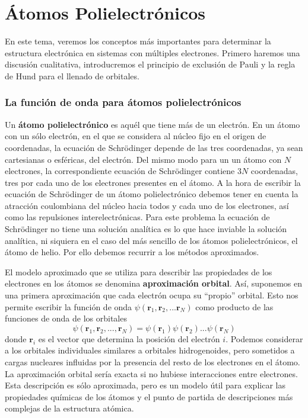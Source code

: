 \chapter{Átomos Polielectrónicos}
En este tema, veremos los conceptos más importantes para determinar 
la estructura electrónica en sistemas con múltiples electrones. Primero 
haremos una discusión cualitativa, introducremos el principio de 
exclusión de Pauli y la regla de Hund para el llenado de orbitales.

\subsection{La función de onda para átomos polielectrónicos}
Un \textbf{átomo polielectrónico} es aquél que tiene más de un electrón.
En un átomo con un sólo electrón, en el que se considera al núcleo
fijo en el origen de coordenadas, la ecuación de Schrödinger depende
de las tres coordenadas, ya sean cartesianas o esféricas, del electrón.
Del mismo modo para un un átomo con $N$ electrones, la correspondiente
ecuación de Schrödinger contiene $3N$ coordenadas, tres por cada uno 
de los electrones presentes en el átomo. A la hora de escribir la 
ecuación de Schrödinger de un átomo polielectrónico debemos tener 
en cuenta la atracción coulombiana del núcleo hacia todos y cada 
uno de los electrones, así como las repulsiones interelectrónicas.
Para este problema la ecuación de Schrödinger no tiene una solución 
analítica es lo que hace inviable la solución analítica, ni siquiera
en el caso del más sencillo de los átomos polielectrónicos, el átomo de 
helio. Por ello debemos recurrir a los métodos aproximados.

El modelo aproximado que se utiliza para describir las propiedades 
de los electrones en los átomos se denomina \textbf{aproximación orbital}. 
Así, suponemos en una primera aproximación que cada electrón ocupa su
“propio” orbital. Esto nos permite escribir la función
de onda $\psi(\mathbf{r}_1,\mathbf{r}_2,...\mathbf{r}_N)$ como producto de las
funciones de onda de los orbitales
\begin{equation}
    \psi(\mathbf{r}_1, \mathbf{r}_2, ..., \mathbf{r}_N) = \psi(\mathbf{r}_1)\psi(\mathbf{r}_2)...\psi(\mathbf{r}_ N)
\end{equation}
donde $\mathbf{r}_i$ es el vector que determina la posición del electrón $i$.
Podemos considerar a los orbitales individuales similares a orbitales
hidrogenoides, pero sometidos a cargas nucleares influidas por la 
presencia del resto de los electrones en el átomo. La aproximación 
orbital sería exacta si no hubiese interacciones entre electrones.
Esta descripción es sólo aproximada, pero es un modelo útil para explicar
las propiedades químicas de los átomos y el punto de partida de 
descripciones más complejas de la estructura atómica. 

